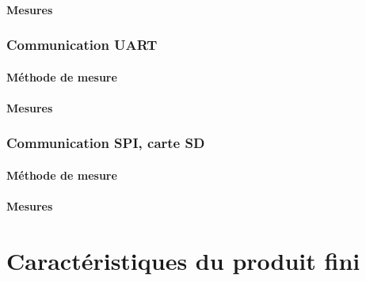 \paragraph{Mesures}

\subsubsection{Communication UART} \label{ssec:Comm-UART}
\paragraph{Méthode de mesure}
\paragraph{Mesures}

\subsubsection{Communication SPI, carte SD} \label{ssec:Comm-SPI}
\paragraph{Méthode de mesure}
\paragraph{Mesures}

\section{Caractéristiques du produit fini} \label{sec:Carac-finis}